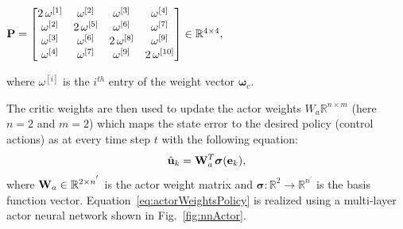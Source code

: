 \documentclass[conference]{IEEEtran}
\begin{document}
 \begin{center}
 ${\bf P}=\begin{bmatrix} 
 2\,\omega^{[1]}    & \omega^{[2]}      & \omega^{[3]}       & \omega^{[4]}        \\ 
 \omega^{[2]}       &2\, \omega^{[5]}   & \omega^{[6]}       & \omega^{[7]}        \\
 \omega^{[3]}       & \omega^{[6]}      &2\, \omega^{[8]}   & \omega^{[9]}   \\   
 \omega^{[4]}       & \omega^{[7]}      & \omega^{[9]}      & 2\,\omega^{[10]}      
 \end{bmatrix}\in \mathbb{R}^{4\times 4},$
 \end{center}
 where $\omega^{[i]}$ is the $i^{th}$ entry of the weight vector $\bm{\omega}_c.$ 

 The critic weights are then used to update the actor weights $W_a\mathbb{R}^{n\times m}$ (here $n=2$ and $m=2$) which maps the state error to the desired policy (control actions) as  at every time step $t$ with the following equation:
 \begin{align}
 \label{eq:actorWeightsPolicy}    
 \hat{\mathbf{u}}_k  =  {\bf W}_a^T \bm{\sigma}(\mathbf{e}_k),
 \end{align}
 where ${\bf W}_a\in\mathbb{R}^{2\times n^{'}}$ is the actor weight matrix and $\bm{\sigma}:\mathbb{R}^2 \to \mathbb{R}^{n^{'}}$ is the basis function vector.  Equation~\eqref{eq:actorWeightsPolicy} is realized using a multi-layer actor neural network shown in Fig.~\ref{fig:nnActor}. %
\end{document}
